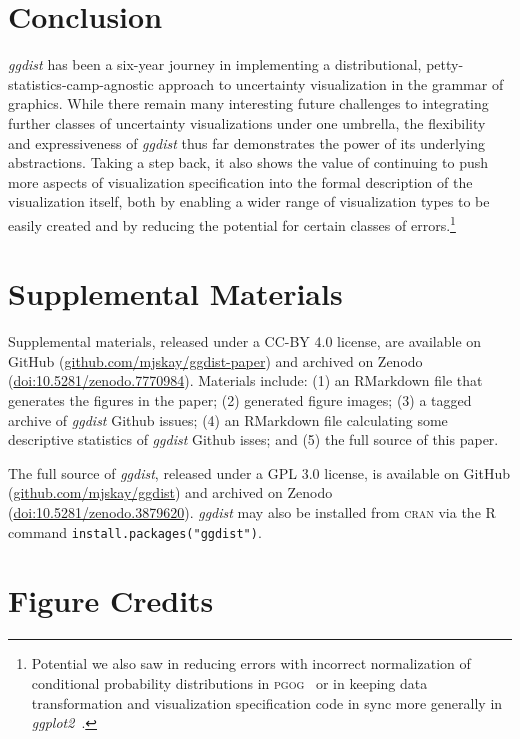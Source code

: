 \documentclass[journal]{vgtc}                     %
\begin{document}
\section{Conclusion}

\textit{ggdist} has been a six-year journey in implementing a distributional, petty-statistics-camp-agnostic approach to uncertainty visualization in the grammar of graphics. While there remain many interesting future challenges to integrating further classes of uncertainty visualizations under one umbrella, the flexibility and expressiveness of \textit{ggdist} thus far demonstrates the power of its underlying abstractions. Taking a step back, it also shows the value of continuing to push more aspects of visualization specification into the formal description of the visualization itself, both by enabling a wider range of visualization types to be easily created and by reducing the potential for certain classes of errors.\footnote{Potential we also saw in reducing errors with incorrect normalization of conditional probability distributions in \textsc{pgog}~\cite{pu2020probabilistic} or in keeping data transformation and visualization specification code in sync more generally in \textit{ggplot2}~\cite{pu2023inpractice}.} 

\section*{Supplemental Materials}
\label{sec:supplemental_materials}

Supplemental materials, released under a CC-BY 4.0 license, are available on GitHub (\href{https://github.com/mjskay/ggdist-paper}{github.com/mjskay/ggdist-paper}) and archived on Zenodo (\href{https://doi.org/10.5281/zenodo.7770984}{doi:10.5281/zenodo.7770984}).
Materials include: (1) an RMarkdown file that generates the figures in the paper; (2) generated figure images; (3) a tagged archive of \textit{ggdist} Github issues; (4) an RMarkdown file calculating some descriptive statistics of \textit{ggdist} Github isses; and (5) the full source of this paper.

The full source of \textit{ggdist}, released under a GPL 3.0 license, is available on GitHub (\href{https://github.com/mjskay/ggdist}{github.com/mjskay/ggdist}) and archived on Zenodo (\href{https://doi.org/10.5281/zenodo.3879620}{doi:10.5281/zenodo.3879620}). \textit{ggdist} may also be installed from \textsc{cran} via the R command \texttt{install.packages("ggdist")}.

\section*{Figure Credits}
\label{sec:figure_credits}
\end{document}
